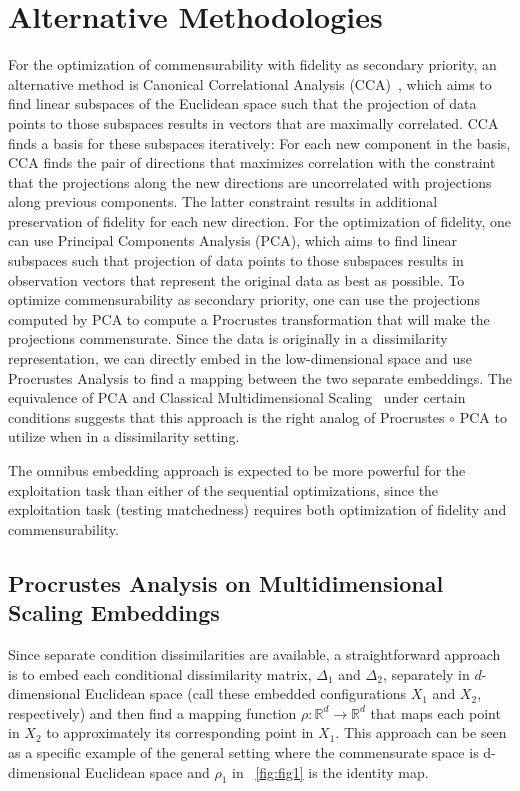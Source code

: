 \documentclass[11pt]{article} %
\begin{document}
\section{Alternative Methodologies}
For the optimization of commensurability with fidelity as  secondary priority, an alternative method is Canonical Correlational Analysis (CCA)~\cite{Hardoon2004}, which aims to find linear subspaces of the Euclidean space  such that the projection of data points to those subspaces results in  vectors that are maximally correlated. CCA finds a basis for these subspaces iteratively: For each new component in the basis, CCA finds the pair of directions that maximizes correlation with the constraint that the projections along the new directions are  uncorrelated  with projections along previous components. The latter constraint results in  additional preservation of fidelity for each new direction. For the optimization of fidelity,  one can use Principal Components Analysis (PCA), which aims to find linear subspaces such that  projection of data points to those subspaces results in observation vectors that represent the original data as best as possible. To optimize commensurability as  secondary priority, one can use the projections computed by PCA to  compute a Procrustes transformation that will make the projections commensurate. Since the data is originally in a dissimilarity representation, we can directly embed in the low-dimensional space and use Procrustes Analysis to find a mapping between the two separate embeddings. The equivalence of PCA and Classical Multidimensional Scaling~\cite{CMDS} under certain conditions suggests that this approach is the right analog of Procrustes $\circ$ PCA to utilize when in a dissimilarity setting. 

 The omnibus embedding  approach is expected to be more powerful for the exploitation task than either of  the sequential optimizations, since the exploitation task (testing matchedness) requires both optimization of fidelity and commensurability.

\subsection{Procrustes Analysis on Multidimensional Scaling Embeddings\label{subsec:PoM}} 
Since separate  condition dissimilarities are available, a straightforward approach is to embed each conditional dissimilarity matrix, $\Delta_1$ and $\Delta_2$, separately  in  $d$-dimensional Euclidean space (call these embedded configurations $X_1$ and $X_2$, respectively) and then find a mapping function $\rho :\mathbb{R}^{d}\rightarrow\mathbb{R}^{d}$ that maps each point in $X_2$ to approximately its corresponding point in $X_1$. This approach can be seen as a specific example of the general setting where the commensurate space is d-dimensional  Euclidean space and $\rho_1$ in  ~\ref{fig:fig1} is the identity map. 
\end{document}
